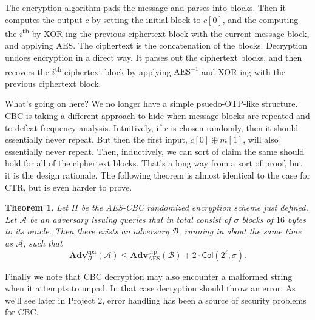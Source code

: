 \documentclass[11pt]{article}
\newtheorem{theorem}{Theorem}
\newcommand{\calA}{\mathcal{A}}
\newcommand{\calB}{\mathcal{B}}
\newcommand{\Adv}{\mathbf{Adv}}
\newcommand{\AdvPRP}[2]{\Adv^{\mathrm{prp}}_{#1}({#2})}
\newcommand{\AdvCPA}[2]{\Adv^{\mathrm{cpa}}_{#1}({#2})}
\newcommand{\barm}{\overline{m}}
\newcommand{\aes}{\mathrm{AES}}
\newcommand{\Col}{\mathsf{Col}}
\begin{document}
The encryption algorithm pads the message and parses into blocks. Then
it computes the output $c$ by setting the initial block to $c[0]$,
and the computing the $i$\textsuperscript{th} by XOR-ing the previous
ciphertext block with the current message block, and applying $\aes$.
The ciphertext is the concatenation of the blocks.
Decryption undoes encryption in a direct way. It parses out the ciphertext
blocks, and then recovers the $i$\textsuperscript{th} ciphertext block
by applying $\aes^{-1}$ and XOR-ing with the previous ciphertext block.

What's going on here? We no longer have a simple psuedo-OTP-like structure.
CBC is taking a different approach to hide when message blocks are repeated and
to defeat frequency analysis. Intuitively, if $r$ is chosen randomly, then it
should essentially never repeat. But then the first input,
$c[0]\oplus\barm[1]$, will also essentially never repeat. Then, inductively, we
can sort of claim the same should hold for all of the ciphertext blocks. That's
a long way from a sort of proof, but it is the design rationale. The following
theorem is almost identical to the case for CTR, but is even harder to
prove.
\begin{theorem}
    Let $\Pi$ be the AES-CBC randomized encryption scheme just defined.  Let
    $\calA$ be an adversary issuing queries that in total consist of $\sigma$
    blocks of $16$ bytes to its oracle. Then there exists an adversary $\calB$,
    running in about the same time as $\calA$, such that
    \[
        \AdvCPA{\Pi}{\calA} \leq \AdvPRP{\aes}{\calB} + 2\cdot \Col(2^\ell,\sigma).
    \]
\end{theorem}


Finally we note that CBC decryption may also encounter a malformed string when
it attempts to unpad. In that case decryption should throw an error. As we'll
see later in Project 2, error handling has been a source of security problems
for CBC.
\end{document}
